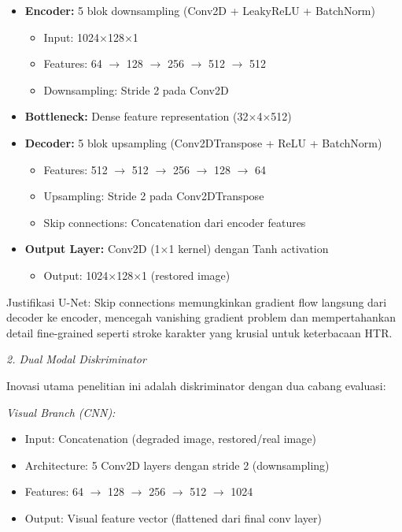 \documentclass[12pt,a4paper]{article}
\begin{document}
\begin{itemize}[leftmargin=*, nosep]
\item \textbf{Encoder:} 5 blok downsampling (Conv2D + LeakyReLU + BatchNorm)
\begin{itemize}[nosep]
\item Input: 1024$\times$128$\times$1
\item Features: 64 $\rightarrow$ 128 $\rightarrow$ 256 $\rightarrow$ 512 $\rightarrow$ 512
\item Downsampling: Stride 2 pada Conv2D
\end{itemize}

\item \textbf{Bottleneck:} Dense feature representation (32$\times$4$\times$512)

\item \textbf{Decoder:} 5 blok upsampling (Conv2DTranspose + ReLU + BatchNorm)
\begin{itemize}[nosep]
\item Features: 512 $\rightarrow$ 512 $\rightarrow$ 256 $\rightarrow$ 128 $\rightarrow$ 64
\item Upsampling: Stride 2 pada Conv2DTranspose
\item Skip connections: Concatenation dari encoder features
\end{itemize}

\item \textbf{Output Layer:} Conv2D (1$\times$1 kernel) dengan Tanh activation
\begin{itemize}[nosep]
\item Output: 1024$\times$128$\times$1 (restored image)
\end{itemize}
\end{itemize}

Justifikasi U-Net: Skip connections memungkinkan gradient flow langsung dari decoder ke encoder, mencegah vanishing gradient problem dan mempertahankan detail fine-grained seperti stroke karakter yang krusial untuk keterbacaan HTR.

\textit{2. Dual Modal Diskriminator}

Inovasi utama penelitian ini adalah diskriminator dengan dua cabang evaluasi:

\textit{Visual Branch (CNN):}
\begin{itemize}[leftmargin=*, nosep]
\item Input: Concatenation (degraded image, restored/real image)
\item Architecture: 5 Conv2D layers dengan stride 2 (downsampling)
\item Features: 64 $\rightarrow$ 128 $\rightarrow$ 256 $\rightarrow$ 512 $\rightarrow$ 1024
\item Output: Visual feature vector (flattened dari final conv layer)
\end{itemize}
\end{document}
